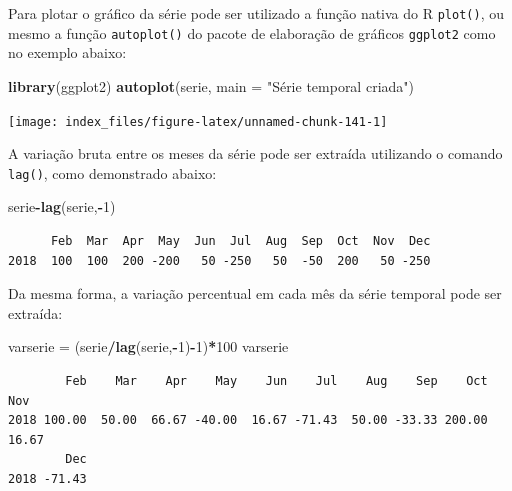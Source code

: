\documentclass[12pt,brazil,oneside]{book}
\newenvironment{Shaded}{\begin{snugshade}}{\end{snugshade}}
\newcommand{\DataTypeTok}[1]{\textcolor[rgb]{0.13,0.29,0.53}{#1}}
\newcommand{\DecValTok}[1]{\textcolor[rgb]{0.00,0.00,0.81}{#1}}
\newcommand{\KeywordTok}[1]{\textcolor[rgb]{0.13,0.29,0.53}{\textbf{#1}}}
\newcommand{\NormalTok}[1]{#1}
\newcommand{\OperatorTok}[1]{\textcolor[rgb]{0.81,0.36,0.00}{\textbf{#1}}}
\newcommand{\StringTok}[1]{\textcolor[rgb]{0.31,0.60,0.02}{#1}}
\begin{document}
Para plotar o gráfico da série pode ser utilizado a função nativa do R \texttt{plot()}, ou mesmo a função \texttt{autoplot()} do pacote de elaboração de gráficos \texttt{ggplot2} como no exemplo abaixo:

\begin{Shaded}
\begin{Highlighting}[]
\KeywordTok{library}\NormalTok{(ggplot2)}
\KeywordTok{autoplot}\NormalTok{(serie, }\DataTypeTok{main =} \StringTok{"Série temporal criada"}\NormalTok{)}
\end{Highlighting}
\end{Shaded}

\begin{center}\texttt{[image: index\_files/figure-latex/unnamed-chunk-141-1]} \end{center}

A variação bruta entre os meses da série pode ser extraída utilizando o comando \texttt{lag()}, como demonstrado abaixo:

\begin{Shaded}
\begin{Highlighting}[]
\NormalTok{serie}\OperatorTok{-}\KeywordTok{lag}\NormalTok{(serie,}\OperatorTok{-}\DecValTok{1}\NormalTok{)}
\end{Highlighting}
\end{Shaded}

\begin{verbatim}
      Feb  Mar  Apr  May  Jun  Jul  Aug  Sep  Oct  Nov  Dec
2018  100  100  200 -200   50 -250   50  -50  200   50 -250
\end{verbatim}

Da mesma forma, a variação percentual em cada mês da série temporal pode ser extraída:

\begin{Shaded}
\begin{Highlighting}[]
\NormalTok{varserie =}\StringTok{ }\NormalTok{(serie}\OperatorTok{/}\KeywordTok{lag}\NormalTok{(serie,}\OperatorTok{-}\DecValTok{1}\NormalTok{)}\OperatorTok{-}\DecValTok{1}\NormalTok{)}\OperatorTok{*}\DecValTok{100}
\NormalTok{varserie}
\end{Highlighting}
\end{Shaded}

\begin{verbatim}
        Feb    Mar    Apr    May    Jun    Jul    Aug    Sep    Oct    Nov
2018 100.00  50.00  66.67 -40.00  16.67 -71.43  50.00 -33.33 200.00  16.67
        Dec
2018 -71.43
\end{verbatim}
\end{document}
